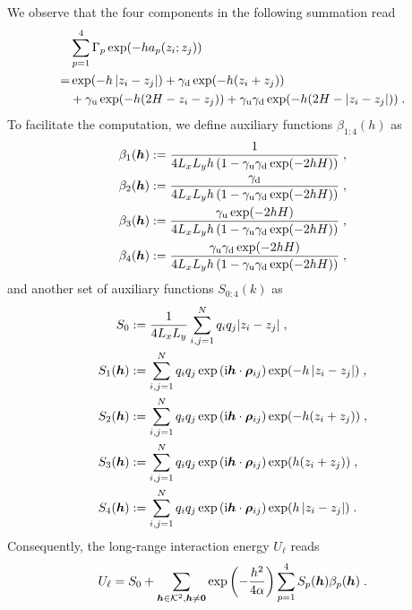 We observe that the four components in the following summation read
\begin{align*}
     &\sum_{p=1}^4\Gamma_p\exp(-ha_p(z_i;z_j))\\  
     =&\exp(- h \left\lvert z_i-z_j\right\rvert)+\gamma_{\mathrm{d}}\exp(-h(z_i+z_j))\\
     &+\gamma_{\mathrm{u}}\exp(-h(2H-z_i-z_j)) +\gamma_{\mathrm{u}}\gamma_{\mathrm{d}}\exp(-h(2H-\left\lvert z_i-z_j\right\rvert))\;.
\end{align*}
To facilitate the computation, we define auxiliary functions $\beta_{1:4}(h)$ as 
\begin{align*}
    \beta_1(\boldsymbol{h})&:= \frac{1}{4  L_xL_yh\left(1-\gamma_{\mathrm{u}}\gamma_{\mathrm{d}}\exp(-2hH)\right)} \;,\\
    \beta_2(\boldsymbol{h})&:= \frac{\gamma_{\mathrm{d}}}{4  L_xL_yh\left(1-\gamma_{\mathrm{u}}\gamma_{\mathrm{d}}\exp(-2hH)\right)} \;,\\
    \beta_3(\boldsymbol{h})&:= \frac{\gamma_{\mathrm{u}}\exp(-2hH)}{4  L_xL_yh\left(1-\gamma_{\mathrm{u}}\gamma_{\mathrm{d}}\exp(-2hH)\right)}\;,\\
    \beta_4(\boldsymbol{h})&:= \frac{\gamma_{\mathrm{u}}\gamma_{\mathrm{d}}\exp(-2hH)}{4  L_xL_yh\left(1-\gamma_{\mathrm{u}}\gamma_{\mathrm{d}}\exp(-2hH)\right)}\;,
\end{align*}
and another set of auxiliary functions   $S_{0:4}(k)$ as
\begin{align*} 
    S_0&:=\frac{1}{4  L_xL_y}\sum_{i,j=1}^Nq_iq_j {\left\lvert z_i-z_j\right\rvert}\;,\\
    S_1(\boldsymbol{h})&:=\sum_{i,j=1}^Nq_iq_j  \exp{(\mathrm{i} \boldsymbol{h} \cdot \boldsymbol{\rho}_{ij})}\exp(-h\left\lvert z_i-z_j\right\rvert)\;,\\
    S_2(\boldsymbol{h})&:=\sum_{i,j=1}^Nq_iq_j  \exp{(\mathrm{i} \boldsymbol{h} \cdot \boldsymbol{\rho}_{ij})}\exp(-h(z_i+z_j))\;,\\
    S_3(\boldsymbol{h})&:=\sum_{i,j=1}^Nq_iq_j  \exp{(\mathrm{i} \boldsymbol{h} \cdot \boldsymbol{\rho}_{ij})}\exp(h(z_i+z_j))\;,\\
    S_4(\boldsymbol{h})&:=\sum_{i,j=1}^Nq_iq_j \exp{(\mathrm{i} \boldsymbol{h} \cdot \boldsymbol{\rho}_{ij})}\exp(h\left\lvert z_i-z_j\right\rvert)\;.
\end{align*}
Consequently, the long-range interaction energy   $U_\ell$ reads
\begin{equation}\label{eq...text...Energy}
    U_\ell = S_0+ \sum_{\boldsymbol{h}\in\mathcal{K}^2,\boldsymbol{h}\neq\bm{0}} \exp\left(-\frac{h^2}{4\alpha}\right)\sum_{p=1}^4S_p(\boldsymbol{h}) \beta_p(\boldsymbol{h})\;.
\end{equation}
